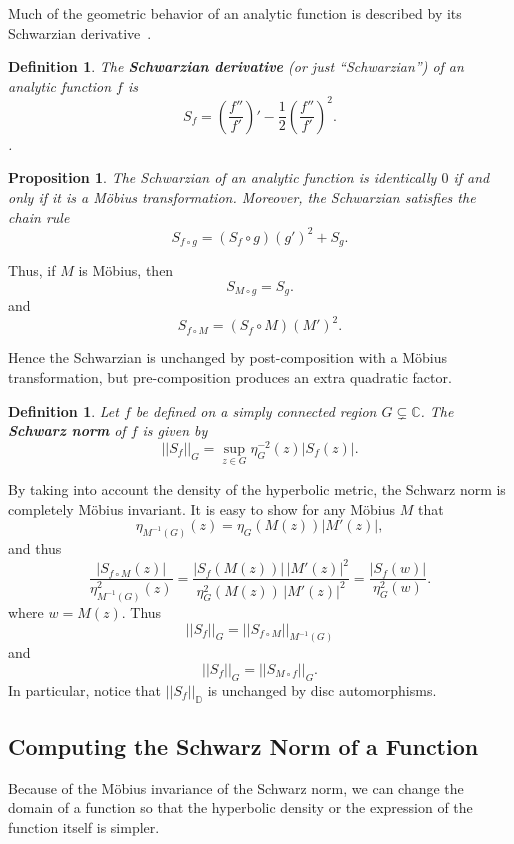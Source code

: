 \documentclass{lms}
\newcommand{\C}{\mathbb C}
\newcommand{\D}{\mathbb D}
\newcommand{\abs}[1]{\lvert#1\rvert}
\newcommand{\norm}[1]{\lvert\lvert#1\rvert\rvert}
\newtheorem{proposition}[theorem]{Proposition}
\newtheorem{definition}[theorem]{Definition}
\numberwithin{equation}{section}
\begin{document}
Much of the geometric behavior of an analytic function is described by
its Schwarzian derivative~\cite{GL2000,oL87}.

\begin{definition}
The \textbf{Schwarzian derivative} (or just ``Schwarzian'') of an
analytic function $f$ is
\[
S_f = \left( \frac{f''}{f'} \right)' - \frac12 \left( \frac{f''}{f'}
\right)^2 .
\].
\end{definition}


\begin{proposition} The Schwarzian of an analytic function is identically $0$
 if and only if it is a M\"obius 
transformation.  Moreover, the Schwarzian satisfies the chain rule
\[
S_{f\circ g}=\left(S_f \circ g\right)\left(g'\right)^2 + S_g.
\]
\end{proposition}

Thus, if $M$ is M\"obius, then 
\[
S_{M\circ g} = S_g.
\]
and
\[
S_{f\circ M}=\left(S_f \circ M\right)\left(M'\right)^2.
\]

Hence the Schwarzian is unchanged by post-composition with a M\"obius
transformation, but pre-composition produces an extra quadratic factor.

\begin{definition}
Let $f$ be defined on a simply connected region $G\subsetneq\C$.
The \textbf{Schwarz norm} of $f$ is given by
\[
\norm{S_f}_{G} = \sup_{z \in G} \eta_G^{-2}(z)\abs{S_f (z)}.
\]
\end{definition}

By taking into account the density of the hyperbolic metric, the
Schwarz norm is completely M\"obius invariant.  It is easy to show
for any M\"obius $M$ that 
\[
\eta_{M^{-1}(G)}(z)=\eta_{G} (M(z)) \abs{M'(z)},
\]
and thus
\[
\frac{\abs{S_{f\circ M}(z)}}{\eta^2_{M^{-1}(G)}(z)} =
\frac{\abs{S_f(M(z))}\,\abs{M'(z)}^2}{\eta^2_{G}(M(z))\,\abs{M'(z)}^2} =
\frac{\abs{S_f(w)}}{\eta^2_{G}(w)}.
\]
where $w=M(z)$.  Thus 
\[
\norm{S_f}_G=\norm{S_{f\circ M}}_{M^{-1}(G)}
\]
and
\[
\norm{S_f}_G=\norm{S_{M\circ f}}_G.
\]
In particular, notice that $\norm{S_f}_\D$ is unchanged by disc
automorphisms.



\subsection{Computing the Schwarz Norm of a Function}

Because of the M\"obius invariance of the Schwarz norm, we can 
change the domain of a function 
so that 
the hyperbolic density or the expression of the function itself is simpler.
\end{document}
